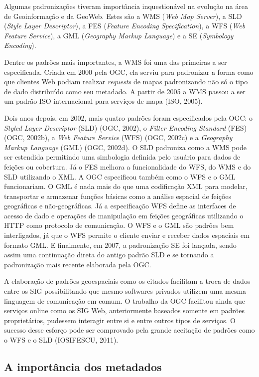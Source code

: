 		Algumas padronizações tiveram importância inquestionável na evolução na área de Geoinformação e da GeoWeb. Estes são a WMS (\textit{Web Map Server}), a SLD (\textit{Style Layer Descriptor}), a FES (\textit{Feature Encoding Specification}), a WFS (\textit{Web Feature Service}), a GML (\textit{Geography Markup Language}) e a SE (\textit{Symbology Encoding}).
		
		Dentre os padrões mais importantes, a WMS foi uma das primeiras a ser especificada. Criada em 2000 pela OGC, ela serviu para padronizar a forma como que clientes Web podiam realizar \textit{requests} de mapas padronizando não só o tipo de dado distribuído como seu metadado. A partir de 2005 a WMS passou a ser um padrão ISO internacional para serviços de mapa (ISO, 2005).
		
		Dois anos depois, em 2002, mais quatro padrões foram especificados pela OGC: o \textit{Styled Layer Descriptor} (SLD) (OGC, 2002), o \textit{Filter Encoding Standard} (FES) (OGC, 2002b), a\textit{ Web Feature Service} (WFS) (OGC, 2002c) e a \textit{Geography Markup Language} (GML) (OGC, 2002d). O SLD padroniza como a WMS pode ser estendida permitindo uma simbologia definida pelo usuário para dados de feições ou cobertura. Já o FES melhora a funcionalidade do WFS, do WMS e do SLD utilizando o XML. A OGC especificou também como o WFS e o GML funcionariam. O GML é nada mais do que uma codificação XML para modelar, transportar e armazenar funções básicas como a análise espacial de feições geográficas e não-geográficas. Já a especificação WFS define as interfaces de acesso de dado e operações de manipulação em feições geográficas utilizando o HTTP como protocolo de comunicação. O WFS e o GML são padrões bem interligados, já que o WFS permite o cliente enviar e receber dados espaciais em formato GML. E finalmente, em 2007, a padronização SE foi lançada, sendo assim uma continuação direta do antigo padrão SLD e se tornando a padronização mais recente elaborada pela OGC.
		
		A elaboração de padrões geoespaciais como os citados facilitam a troca de dados entre os SIG possibilitando que mesmo softwares privados utilizem uma mesma linguagem de comunicação em comum. O trabalho da OGC facilitou ainda que serviços online como os SIG Web, anteriormente baseados somente em padrões proprietários, pudessem interagir entre si e entre outros tipos de serviços. O sucesso desse esforço pode ser comprovado pela grande aceitação de padrões como o WFS e o SLD (IOSIFESCU, 2011).
		
		\subsection{A importância dos metadados}
		

